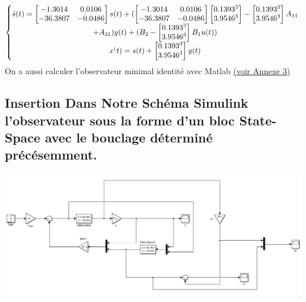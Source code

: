 \begin{equation}
\left\{\begin{matrix}
\dot{s}(t)=\begin{bmatrix}
-1.3014 & 0.0106\\
 -36.3807 & -0.0486\\
\end{bmatrix}s(t)+(\begin{bmatrix}
-1.3014 & 0.0106\\
 -36.3807 & -0.0486\\
\end{bmatrix}\begin{bmatrix}
0.1393^{3}\\
3.9546^{3}\\
\end{bmatrix}-\begin{bmatrix}
0.1393^{3}\\
3.9546^{3}\\
\end{bmatrix}A_{11}\\
+A_{21})y(t)+(B_{2}-
\begin{bmatrix}
0.1393^{3}\\
3.9546^{3}\\
\end{bmatrix}B_{1}u(t))\\
 x^(t)=s(t)+\begin{bmatrix}
0.1393^{3}\\
3.9546^{3}\\
\end{bmatrix}y(t)\\
\end{matrix}\right.\\\\
\end{equation}   
On a aussi calculer l'observateur minimal identité avec Matlab \hyperref[section1.3]{(voir Annexe 3)}\label{annexe3}\\
 
 \subsection{Insertion Dans Notre  Schéma Simulink l’observateur sous la forme d’un bloc State-Space avec le bouclage déterminé précésemment.}

\begin{center}
\includegraphics[scale=0.4]{schemabloc2.PNG}
\label{fig1} 
\end{center}   
  
